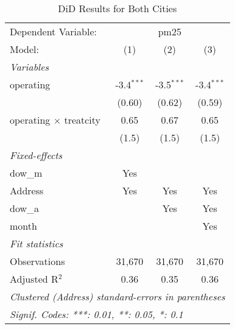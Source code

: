 
\begin{table}[htbp]
   \caption{DiD Results for Both Cities}
   \centering
   \begin{tabular}{lccc}
      \tabularnewline \midrule \midrule
      Dependent Variable: & \multicolumn{3}{c}{pm25}\\
      Model:                        & (1)          & (2)          & (3)\\  
      \midrule
      \emph{Variables}\\
      operating                     & -3.4$^{***}$ & -3.5$^{***}$ & -3.4$^{***}$\\   
                                    & (0.60)       & (0.62)       & (0.59)\\   
      operating $\times$ treatcity  & 0.65         & 0.67         & 0.65\\   
                                    & (1.5)        & (1.5)        & (1.5)\\   
      \midrule
      \emph{Fixed-effects}\\
      dow\_m                        & Yes          &              & \\  
      Address                       & Yes          & Yes          & Yes\\  
      dow\_a                        &              & Yes          & Yes\\  
      month                         &              &              & Yes\\  
      \midrule
      \emph{Fit statistics}\\
      Observations                  & 31,670       & 31,670       & 31,670\\  
      Adjusted R$^2$                & 0.36         & 0.35         & 0.36\\  
      \midrule \midrule
      \multicolumn{4}{l}{\emph{Clustered (Address) standard-errors in parentheses}}\\
      \multicolumn{4}{l}{\emph{Signif. Codes: ***: 0.01, **: 0.05, *: 0.1}}\\
   \end{tabular}
\end{table}


